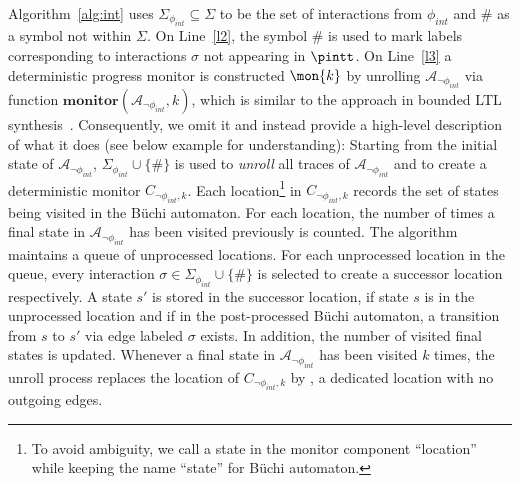 Algorithm~\ref{alg:int} uses $\Sigma_{\phi_{int}} \subseteq \Sigma$ to
be the set of interactions from $\phi_{int}$ and $\#$ as a symbol
not within $\Sigma$. 
On Line~\ref{l2}, the symbol $\#$ is used to mark labels corresponding
to interactions $\sigma$ not appearing in $\pintt$. On Line~\ref{l3} a
deterministic progress monitor is constructed $\mon{k}$ by unrolling
$\mathcal{A}_{\neg\phi_{int}}$ via function $\textbf{monitor}(\mathcal{A}_{\neg\phi_{int}}, k)$, which is similar to the
approach in bounded LTL synthesis~\cite{ScheweF07a}. Consequently, we
omit it and instead provide a high-level description of what it does (see below example for understanding):
Starting from the initial state of $\mathcal{A}_{\neg\phi_{int}}$,
$\Sigma_{\phi_{int}}\cup \{\#\}$ is used to \emph{unroll} all traces
of $\mathcal{A}_{\neg\phi_{int}}$ and to create a deterministic
monitor $C_{\neg \phi_{int},k}$. Each location\footnote{To avoid
  ambiguity, we call a state in the monitor component ``location''
  while keeping the name ``state'' for B\"uchi automaton.}  in
$C_{\neg \phi_{int},k}$ records the set of states being visited in the
B\"uchi automaton. For each location, the number of times a final state
in $\mathcal{A}_{\neg\phi_{int}}$ has been visited previously is counted.
The algorithm maintains a queue of unprocessed locations. For each
unprocessed location in the queue, every interaction $\sigma \in
\Sigma_{\phi_{int}} \cup \{\#\}$ is selected to create a successor
location respectively. A state $s'$ is stored in the successor
location, if state $s$ is in the unprocessed location and if in the
post-processed B\"uchi automaton, a transition from $s$ to $s'$ via
edge labeled $\sigma$ exists. In addition, the number of visited final
states is updated. Whenever a final state in
$\mathcal{A}_{\neg\phi_{int}}$ has been visited $k$ times, the unroll
process replaces the location of $C_{\neg \phi_{int},k}$ by
, a dedicated location with no outgoing edges. 

